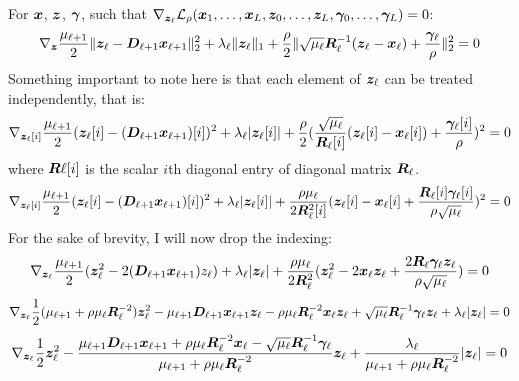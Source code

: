For $\bm{x}$, $\bm{z}$, $\bm{\gamma}$, such that $\nabla_{\bm{z}_{\ell}} \mathcal{L}_{\rho}(\bm{x}_1,\hdots,\bm{x}_L,\bm{z}_0,\hdots,\bm{z}_L,\bm{\gamma}_0,\hdots,\bm{\gamma}_L) = 0$:
%
\begin{equation}
\nabla_{\bm{z}} \frac{\mu_{\ell + 1}}{2}\|\bm{z}_{\ell} - \bm{D}_{\ell + 1}\bm{x}_{\ell + 1}\|_2^2 + \lambda_{\ell}\|\bm{z}_{\ell}\|_1 + \frac{\rho}{2} \|\sqrt{\mu_{\ell}}\bm{R}_{\ell}^{-1}(\bm{z}_{\ell} - \bm{x}_{\ell}) + \frac{\bm{\gamma}_{\ell}}{\rho}\|_2^2 = 0
\end{equation}
%
Something important to note here is that each element of $\bm{z}_{\ell}$ can be treated independently, that is:
%
\begin{equation}
\nabla_{\bm{z}_{\ell}[i]} \frac{\mu_{\ell + 1}}{2}(\bm{z}_{\ell}[i] - (\bm{D}_{\ell + 1}\bm{x}_{\ell + 1})[i])^2 + \lambda_{\ell}|\bm{z}_{\ell}[i]| + \frac{\rho}{2} (\frac{\sqrt{\mu_{\ell}}}{\bm{R}_{\ell}[i]}(\bm{z}_{\ell}[i] - \bm{x}_{\ell}[i]) + \frac{\bm{\gamma}_{\ell}[i]}{\rho})^2 = 0
\end{equation}
%
where $\bm{R}{\ell}[i]$ is the scalar $i$th diagonal entry of diagonal matrix $\bm{R}_{\ell}$.
%
\begin{equation}
\nabla_{\bm{z}_{\ell}[i]} \frac{\mu_{\ell + 1}}{2}(\bm{z}_{\ell}[i] - (\bm{D}_{\ell + 1}\bm{x}_{\ell + 1})[i])^2 + \lambda_{\ell}|\bm{z}_{\ell}[i]| + \frac{\rho\mu_{\ell}}{2\bm{R}_{\ell}^2[i]} (\bm{z}_{\ell}[i] - \bm{x}_{\ell}[i] + \frac{\bm{R}_{\ell}[i]\bm{\gamma}_{\ell}[i]}{\rho\sqrt{\mu_{\ell}}})^2 = 0
\end{equation}
%
For the sake of brevity, I will now drop the indexing:
%
\begin{equation}
\nabla_{\bm{z}_{\ell}} \frac{\mu_{\ell + 1}}{2}(\bm{z}_{\ell}^2 - 2(\bm{D}_{\ell + 1}\bm{x}_{\ell + 1})z_{\ell}) + \lambda_{\ell}|\bm{z}_{\ell}| + \frac{\rho\mu_{\ell}}{2\bm{R}_{\ell}^2} (\bm{z}_{\ell}^2 - 2\bm{x}_{\ell}\bm{z}_{\ell} + \frac{2\bm{R}_{\ell}\bm{\gamma}_{\ell}\bm{z}_{\ell}}{\rho\sqrt{\mu_{\ell}}}) = 0
\end{equation}
%
\begin{equation}
\nabla_{\bm{z}_{\ell}} \frac{1}{2}(\mu_{\ell + 1} + \rho\mu_{\ell}\bm{R}_{\ell}^{-2})\bm{z}_{\ell}^2 - \mu_{\ell + 1}\bm{D}_{\ell + 1}\bm{x}_{\ell + 1}\bm{z}_{\ell} - \rho\mu_{\ell}\bm{R}_{\ell}^{-2}\bm{x}_{\ell}\bm{z}_{\ell} + \sqrt{\mu_{\ell}}\bm{R}_{\ell}^{-1}\bm{\gamma}_{\ell}\bm{z}_{\ell} + \lambda_{\ell}|\bm{z}_{\ell}| = 0
\end{equation}
%
\begin{equation}
\nabla_{\bm{z}_{\ell}} \frac{1}{2}\bm{z}_{\ell}^2 - \frac{\mu_{\ell + 1}\bm{D}_{\ell + 1}\bm{x}_{\ell + 1} + \rho\mu_{\ell}\bm{R}_{\ell}^{-2}\bm{x}_{\ell} - \sqrt{\mu_{\ell}}\bm{R}_{\ell}^{-1}\bm{\gamma}_{\ell}}{\mu_{\ell + 1} + \rho\mu_{\ell}\bm{R}_{\ell}^{-2}}\bm{z}_{\ell} + \frac{\lambda_{\ell}}{\mu_{\ell + 1} + \rho\mu_{\ell}\bm{R}_{\ell}^{-2}}|\bm{z}_{\ell}| = 0
\end{equation}
